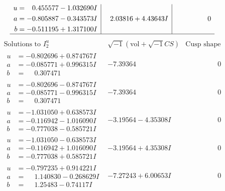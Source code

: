 \documentclass[1p]{elsarticle_modified}
\theoremstyle{definition}
\newcommand{\I}{\sqrt{-1}}
\begin{document}
$$\begin{array}{c|c|c}
\begin{aligned}
u &= \phantom{-}0.455577 - 1.032690 I \\
a &= -0.805887 - 0.343573 I \\
b &= -0.511195 + 1.317100 I\end{aligned}
 & \phantom{-}2.03816 + 4.43643 I & \phantom{-0.000000 } 0\\
 \hline 
 \end{array}$$\newpage$$\begin{array}{c|c|c}  
\text{Solutions to }I^u_{2}& \I (\text{vol} + \sqrt{-1}CS) & \text{Cusp shape}\\
 \hline 
\begin{aligned}
u &= -0.802696 + 0.874767 I \\
a &= -0.085771 + 0.996315 I \\
b &= \phantom{-}0.307471\phantom{ +0.000000I}\end{aligned}
 & -7.39364\phantom{ +0.000000I} & \phantom{-0.000000 } 0 \\ \hline\begin{aligned}
u &= -0.802696 - 0.874767 I \\
a &= -0.085771 - 0.996315 I \\
b &= \phantom{-}0.307471\phantom{ +0.000000I}\end{aligned}
 & -7.39364\phantom{ +0.000000I} & \phantom{-0.000000 } 0 \\ \hline\begin{aligned}
u &= -1.031050 + 0.638573 I \\
a &= -0.116942 - 1.016090 I \\
b &= -0.777038 - 0.585721 I\end{aligned}
 & -3.19564 - 4.35308 I & \phantom{-0.000000 } 0 \\ \hline\begin{aligned}
u &= -1.031050 - 0.638573 I \\
a &= -0.116942 + 1.016090 I \\
b &= -0.777038 + 0.585721 I\end{aligned}
 & -3.19564 + 4.35308 I & \phantom{-0.000000 } 0 \\ \hline\begin{aligned}
u &= -0.797235 + 0.914221 I \\
a &= \phantom{-}1.140830 - 0.268629 I \\
b &= \phantom{-}1.25483 - 0.74117 I\end{aligned}
 & -7.27243 + 6.00653 I & \phantom{-0.000000 } 0 \\ \hline\begin{aligned}

\end{aligned}
\end{array}$$
\end{document}
